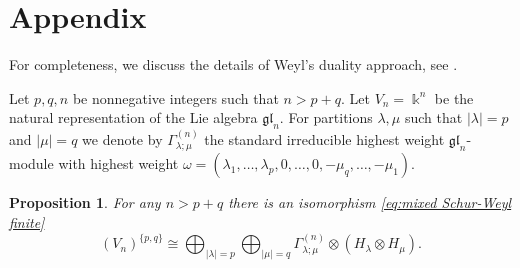 \documentclass[12pt,reqno]{amsart}
\numberwithin{equation}{section}
\theoremstyle{plain}
\newtheorem{prop}[thm]{Proposition}
\theoremstyle{definition}
\def\gl{\mathfrak{gl}}
\def\o{\otimes}
\begin{document}
\section{Appendix}

For completeness, we discuss the details of Weyl's duality approach,
see \cite{W,FH}.

Let $p,q, n$ be nonnegative integers such that $n > p+q$.
Let $V_n = \Bbbk^n$ be the natural representation of the Lie algebra $\gl_n$.
For partitions $\lambda,\mu$ such that $|\lambda| = p$ and $|\mu| = q$
we denote by $\varGamma_{\lambda;\mu}^{(n)}$ the standard irreducible highest weight $\gl_n$-module with highest weight
$\omega = (\lambda_1,\dots,\lambda_p,0,\dots,0,-\mu_q,\dots,-\mu_1)$.

\begin{prop}
For any $n>p+q$ there is an isomorphism \eqref{eq:mixed Schur-Weyl finite}
\begin{equation*}
    (V_n)^{\{p,q\}} \cong \bigoplus_{|\lambda|=p} \bigoplus_{|\mu| = q}
    \Gamma_{\lambda;\mu}^{(n)} \o (H_\lambda \o H_\mu).
\end{equation*}

\end{prop}
\end{document}
